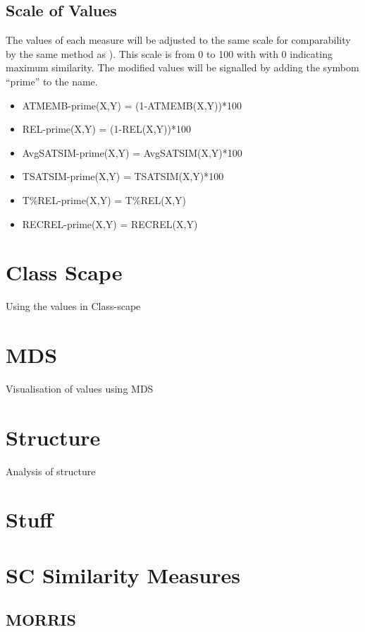 \documentclass{article}
\begin{document}
\subsection{Scale of Values}
\label{sec-7-5}

The values of each measure will be adjusted to the same scale for
comparability by the same method as \citet[pp. 48]{Kuusi2001}). This
scale is from 0 to 100 with with 0 indicating maximum similarity. The
modified values will be signalled by adding the symbom ``prime'' to the
name.
\begin{itemize}
\item ATMEMB-prime(X,Y) = (1-ATMEMB(X,Y))*100
\item REL-prime(X,Y) = (1-REL(X,Y))*100
\item AvgSATSIM-prime(X,Y) = AvgSATSIM(X,Y)*100
\item TSATSIM-prime(X,Y) = TSATSIM(X,Y)*100
\item T\%REL-prime(X,Y) = T\%REL(X,Y)
\item RECREL-prime(X,Y) = RECREL(X,Y)
\end{itemize}
\section{Class Scape}
\label{sec-8}

Using the values in Class-scape
\section{MDS}
\label{sec-9}

Visualisation of values using MDS
\section{Structure}
\label{sec-10}

Analysis of structure
\section{Stuff}
\label{sec-11}

\clearpage



\clearpage
\appendix
\section{SC Similarity Measures}
\label{sec-12}
\subsection{MORRIS}
\label{sec-12-1}
\end{document}
